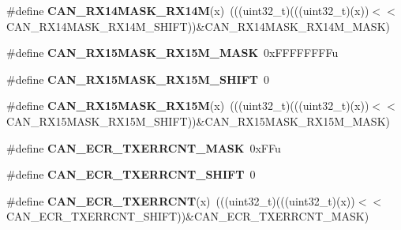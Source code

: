 \begin{DoxyCompactItemize}
\item 
\#define {\bfseries C\+A\+N\+\_\+\+R\+X14\+M\+A\+S\+K\+\_\+\+R\+X14M}(x)~(((uint32\+\_\+t)(((uint32\+\_\+t)(x))$<$$<$C\+A\+N\+\_\+\+R\+X14\+M\+A\+S\+K\+\_\+\+R\+X14\+M\+\_\+\+S\+H\+I\+FT))\&C\+A\+N\+\_\+\+R\+X14\+M\+A\+S\+K\+\_\+\+R\+X14\+M\+\_\+\+M\+A\+SK)\hypertarget{group__CAN__Register__Masks_ga23bf60adcf45d8330ade3f9cb43578a6}{}\label{group__CAN__Register__Masks_ga23bf60adcf45d8330ade3f9cb43578a6}

\item 
\#define {\bfseries C\+A\+N\+\_\+\+R\+X15\+M\+A\+S\+K\+\_\+\+R\+X15\+M\+\_\+\+M\+A\+SK}~0x\+F\+F\+F\+F\+F\+F\+F\+Fu\hypertarget{group__CAN__Register__Masks_gaf81f33076f662d5f4c737076e36e93b7}{}\label{group__CAN__Register__Masks_gaf81f33076f662d5f4c737076e36e93b7}

\item 
\#define {\bfseries C\+A\+N\+\_\+\+R\+X15\+M\+A\+S\+K\+\_\+\+R\+X15\+M\+\_\+\+S\+H\+I\+FT}~0\hypertarget{group__CAN__Register__Masks_ga1420efdd894578fe2a31563c25b58e59}{}\label{group__CAN__Register__Masks_ga1420efdd894578fe2a31563c25b58e59}

\item 
\#define {\bfseries C\+A\+N\+\_\+\+R\+X15\+M\+A\+S\+K\+\_\+\+R\+X15M}(x)~(((uint32\+\_\+t)(((uint32\+\_\+t)(x))$<$$<$C\+A\+N\+\_\+\+R\+X15\+M\+A\+S\+K\+\_\+\+R\+X15\+M\+\_\+\+S\+H\+I\+FT))\&C\+A\+N\+\_\+\+R\+X15\+M\+A\+S\+K\+\_\+\+R\+X15\+M\+\_\+\+M\+A\+SK)\hypertarget{group__CAN__Register__Masks_ga38935337048fdd5cb3b222d00047f4fe}{}\label{group__CAN__Register__Masks_ga38935337048fdd5cb3b222d00047f4fe}

\item 
\#define {\bfseries C\+A\+N\+\_\+\+E\+C\+R\+\_\+\+T\+X\+E\+R\+R\+C\+N\+T\+\_\+\+M\+A\+SK}~0x\+F\+Fu\hypertarget{group__CAN__Register__Masks_gae4da1b026e86291036b8b7d7e78bffa7}{}\label{group__CAN__Register__Masks_gae4da1b026e86291036b8b7d7e78bffa7}

\item 
\#define {\bfseries C\+A\+N\+\_\+\+E\+C\+R\+\_\+\+T\+X\+E\+R\+R\+C\+N\+T\+\_\+\+S\+H\+I\+FT}~0\hypertarget{group__CAN__Register__Masks_ga4f1e9e374563ef6c0502d1a441caf396}{}\label{group__CAN__Register__Masks_ga4f1e9e374563ef6c0502d1a441caf396}

\item 
\#define {\bfseries C\+A\+N\+\_\+\+E\+C\+R\+\_\+\+T\+X\+E\+R\+R\+C\+NT}(x)~(((uint32\+\_\+t)(((uint32\+\_\+t)(x))$<$$<$C\+A\+N\+\_\+\+E\+C\+R\+\_\+\+T\+X\+E\+R\+R\+C\+N\+T\+\_\+\+S\+H\+I\+FT))\&C\+A\+N\+\_\+\+E\+C\+R\+\_\+\+T\+X\+E\+R\+R\+C\+N\+T\+\_\+\+M\+A\+SK)\hypertarget{group__CAN__Register__Masks_ga64aaa4f8bafb2c1e5e79adf2acdc50fb}{}\label{group__CAN__Register__Masks_ga64aaa4f8bafb2c1e5e79adf2acdc50fb}


\end{DoxyCompactItemize}

